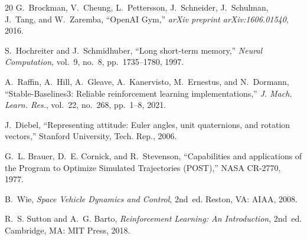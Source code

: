 \documentclass[conference]{IEEEtran}
\begin{document}
\begin{thebibliography}{20}
G.~Brockman, V.~Cheung, L.~Pettersson, J.~Schneider, J.~Schulman, J.~Tang, and W.~Zaremba, ``OpenAI Gym,'' \textit{arXiv preprint arXiv:1606.01540}, 2016.

S.~Hochreiter and J.~Schmidhuber, ``Long short-term memory,'' \textit{Neural Computation}, vol.~9, no.~8, pp.~1735--1780, 1997.

A.~Raffin, A.~Hill, A.~Gleave, A.~Kanervisto, M.~Ernestus, and N.~Dormann, ``Stable-Baselines3: Reliable reinforcement learning implementations,'' \textit{J. Mach. Learn. Res.}, vol.~22, no.~268, pp.~1--8, 2021.

J.~Diebel, ``Representing attitude: Euler angles, unit quaternions, and rotation vectors,'' Stanford University, Tech. Rep., 2006.

G.~L. Brauer, D.~E. Cornick, and R.~Stevenson, ``Capabilities and applications of the Program to Optimize Simulated Trajectories (POST),'' NASA CR-2770, 1977.

B.~Wie, \textit{Space Vehicle Dynamics and Control}, 2nd~ed. Reston, VA: AIAA, 2008.

R.~S. Sutton and A.~G. Barto, \textit{Reinforcement Learning: An Introduction}, 2nd~ed. Cambridge, MA: MIT Press, 2018.

\end{thebibliography}
\end{document}
